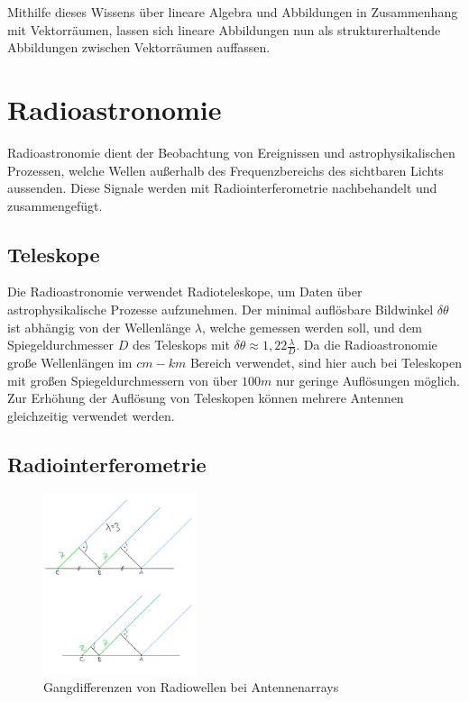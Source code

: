 \documentclass[]{dsadokumentation}
\begin{document}
Mithilfe dieses Wissens über lineare Algebra und Abbildungen in Zusammenhang mit Vektorräumen, lassen sich lineare Abbildungen nun als strukturerhaltende Abbildungen zwischen Vektorräumen auffassen.

\section{Radioastronomie}

Radioastronomie dient der Beobachtung von Ereignissen und astrophysikalischen Prozessen, welche Wellen außerhalb des Frequenzbereichs des sichtbaren Lichts aussenden. Diese Signale werden mit Radiointerferometrie nachbehandelt und zusammengefügt.

\subsection{Teleskope}

Die Radioastronomie verwendet Radioteleskope, um Daten über astrophysikalische Prozesse aufzunehmen.
Der minimal auflösbare Bildwinkel $\delta\theta$ ist abhängig von der Wellenlänge $\lambda$, welche gemessen werden soll, und dem Spiegeldurchmesser $D$ des Teleskops mit $\delta\theta\approx1,22\frac{\lambda}{D}$.
Da die Radioastronomie große Wellenlängen im $cm-km$ Bereich verwendet, sind hier auch bei Teleskopen mit großen Spiegeldurchmessern von über $100m$ nur geringe Auflösungen möglich. Zur Erhöhung der Auflösung von Teleskopen können mehrere Antennen gleichzeitig verwendet werden.

\subsection{Radiointerferometrie}
\begin{figure}
  \centering
  \includegraphics[width=0.4\textwidth]{k4.2/baselineunterschied.png}
  \caption{Gangdifferenzen von Radiowellen bei Antennenarrays}
  \label{k4.2.radioastro.interfero.bild.baselineunterschied}
\end{figure}
\end{document}
